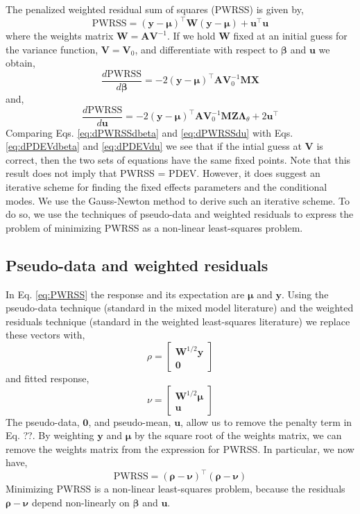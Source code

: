 \documentclass{jss}
\begin{document}
The penalized weighted residual sum of squares (PWRSS) is given by,
\begin{equation}
\mathrm{PWRSS} = (\bm y-\bm\mu)^\top \bm W (\bm y-\bm\mu) + \bm u^\top
\bm u
\label{eq:PWRSS}
\end{equation}
where the weights matrix $\bm W = \bm A \bm V^{-1}$. If we hold $\bm
W$ fixed at an initial
guess for the variance function, $\bm V = \bm V_0$, and differentiate with
respect to $\bm\beta$ and $\bm u$ we obtain,
\begin{equation}
\frac{d \mathrm{PWRSS}}{d \bm\beta} = 
-2 (\bm y - \bm\mu)^\top \bm A
\bm V_0^{-1}
\bm M
\bm X
\label{eq:dPWRSSdbeta}
\end{equation}
and,
\begin{equation}
\frac{d \mathrm{PWRSS}}{d \bm u} = 
-2 (\bm y - \bm\mu)^\top \bm A
\bm V_0^{-1}
\bm M
\bm Z \bm\Lambda_\theta +
2\bm u^\top
\label{eq:dPWRSSdu}
\end{equation}
Comparing Eqs. \ref{eq:dPWRSSdbeta} and \ref{eq:dPWRSSdu} with Eqs. \ref{eq:dPDEVdbeta} and \ref{eq:dPDEVdu} we see that if the intial guess at $\bm
V$ is correct, then the two sets of equations have the same fixed
points. Note that this result does not imply that PWRSS = PDEV. However, it does suggest an iterative scheme for finding the
fixed effects parameters and the conditional modes. We use the Gauss-Newton
method to derive such an iterative scheme. To do so, we use the techniques
of pseudo-data and weighted residuals to express the problem of
minimizing PWRSS as a non-linear least-squares problem.

\subsection{Pseudo-data and weighted residuals}

In Eq. \ref{eq:PWRSS} the response and its expectation are $\bm\mu$ and $\bm
y$. Using the pseudo-data technique (standard in the mixed model
literature) and the weighted residuals technique (standard in the
weighted least-squares literature) we replace these vectors with,
\begin{equation}
\rho = 
\begin{bmatrix}
\bm W^{1/2}\bm y \\
\bm 0
\end{bmatrix}
\end{equation}
and fitted response,
\begin{equation}
\nu = 
\begin{bmatrix}
\bm W^{1/2}\bm \mu \\
\bm u
\end{bmatrix}
\end{equation}
The pseudo-data, $\bm 0$, and pseudo-mean, $\bm u$, allow us to remove
the penalty term in Eq. ??.  By weighting $\bm y$ and $\bm\mu$ by the
square root of the weights matrix, we can remove the weights matrix
from the expression for PWRSS. In particular, we now have,
\begin{equation}
\mathrm{PWRSS} = (\bm\rho - \bm\nu)^\top (\bm\rho - \bm\nu)
\end{equation}
Minimizing PWRSS is a non-linear least-squares problem, because the
residuals $\bm\rho - \bm\nu$ depend non-linearly on $\bm\beta$ and
$\bm u$.
\end{document}
